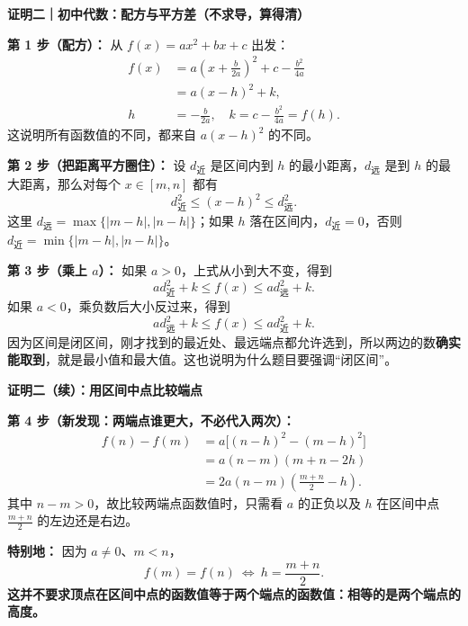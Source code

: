 \begin{proofbox}
\textbf{\textcolor{CProof}{证明二｜初中代数：配方与平方差（不求导，算得清）}}



\textbf{第 1 步（配方）：} 从 $f(x)=ax^2+bx+c$ 出发：
\[
\begin{aligned}
f(x)&=a\left(x+\frac{b}{2a}\right)^2+c-\frac{b^2}{4a}\\
&=a(x-h)^2+k,\\
h&=-\frac{b}{2a},\quad k=c-\frac{b^2}{4a}=f(h).
\end{aligned}
\]
这说明所有函数值的不同，都来自 $a(x-h)^2$ 的不同。

\textbf{第 2 步（把距离平方圈住）：} 设 $d_{\text{近}}$ 是区间内到 $h$ 的最小距离，$d_{\text{远}}$ 是到 $h$ 的最大距离，那么对每个 $x\in[m,n]$ 都有
\[
 d_{\text{近}}^2\le (x-h)^2\le d_{\text{远}}^2.
\]
这里 $d_{\text{远}}=\max\{|m-h|,|n-h|\}$；如果 $h$ 落在区间内，$d_{\text{近}}=0$，否则 $d_{\text{近}}=\min\{|m-h|,|n-h|\}$。

\textbf{第 3 步（乘上 $a$）：} 如果 $a>0$，上式从小到大不变，得到
\[
 a d_{\text{近}}^2+k\le f(x)\le a d_{\text{远}}^2+k.
\]
如果 $a<0$，乘负数后大小反过来，得到
\[
 a d_{\text{远}}^2+k\le f(x)\le a d_{\text{近}}^2+k.
\]
因为区间是闭区间，刚才找到的最近处、最远端点都允许选到，所以两边的数\textbf{确实能取到}，就是最小值和最大值。这也说明为什么题目要强调“闭区间”。

\end{proofbox}\clearpage\begin{proofbox}
\textbf{\textcolor{CProof}{证明二（续）：用区间中点比较端点}}

\textbf{第 4 步（新发现：两端点谁更大，不必代入两次）：}
\[
\begin{aligned}
f(n)-f(m)
 &=a\big[(n-h)^2-(m-h)^2\big]\\
 &=a(n-m)(m+n-2h)\\
 &=2a(n-m)\left(\frac{m+n}{2}-h\right).
\end{aligned}
\]
其中 $n-m>0$，故比较两端点函数值时，只需看 $a$ 的正负以及 $h$ 在区间中点 $\frac{m+n}{2}$ 的左边还是右边。

\textbf{特别地：} 因为 $a\ne0$、$m<n$，
\[
 \boxed{f(m)=f(n)\ \Longleftrightarrow\ h=\frac{m+n}{2}.}
\]
\textbf{这并不要求顶点在区间中点的函数值等于两个端点的函数值：相等的是两个端点的高度。}

\medskip

\end{proofbox}
\clearpage
